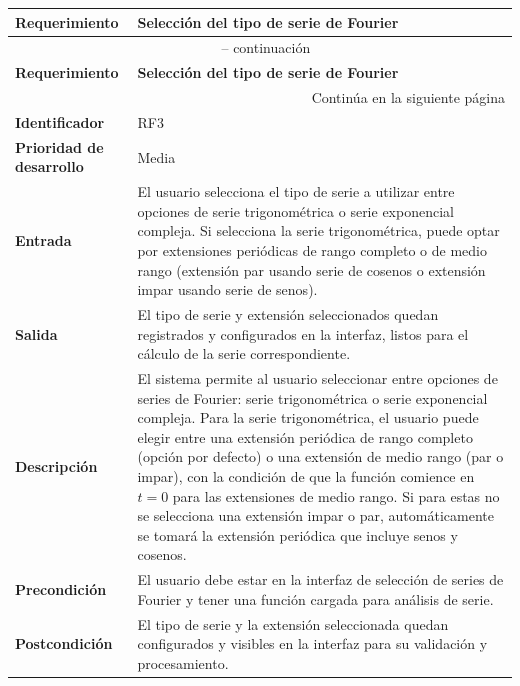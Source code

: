 \begin{longtable}{|m{3.5cm}|m{9.5cm}|}
	\hline
	\rowcolor{black!75} \color{white}\textbf{Requerimiento} & \color{white}\textbf{Selección del tipo de serie de Fourier} \\
	\hline
	\endfirsthead
	\multicolumn{2}{c}{{\tablename\ \thetable{} -- continuación}} \\
	\hline
	\rowcolor{black!75} \color{white}\textbf{Requerimiento} & \color{white}\textbf{Selección del tipo de serie de Fourier} \\
	\hline
	\endhead
	\hline \multicolumn{2}{r}{{Continúa en la siguiente página}} \\
	\endfoot
	\hline
	\endlastfoot
	
	\textbf{Identificador} & RF3 \\
	\hline
	\textbf{Prioridad de desarrollo} & Media \\
	\hline
	\textbf{Entrada} & El usuario selecciona el tipo de serie a utilizar entre opciones de serie trigonométrica o serie exponencial compleja. Si selecciona la serie trigonométrica, puede optar por extensiones periódicas de rango completo o de medio rango (extensión par usando serie de cosenos o extensión impar usando serie de senos). \\
	\hline
	\textbf{Salida} & El tipo de serie y extensión seleccionados quedan registrados y configurados en la interfaz, listos para el cálculo de la serie correspondiente. \\
	\hline
	\textbf{Descripción} & El sistema permite al usuario seleccionar entre opciones de series de Fourier: serie trigonométrica o serie exponencial compleja. Para la serie trigonométrica, el usuario puede elegir entre una extensión periódica de rango completo (opción por defecto) o una extensión de medio rango (par o impar), con la condición de que la función comience en \( t = 0 \) para las extensiones de medio rango. Si para estas no se selecciona una extensión impar o par, automáticamente se tomará la extensión periódica que incluye senos y cosenos. \\
	\hline
	\textbf{Precondición} & El usuario debe estar en la interfaz de selección de series de Fourier y tener una función cargada para análisis de serie. \\
	\hline
	\textbf{Postcondición} & El tipo de serie y la extensión seleccionada quedan configurados y visibles en la interfaz para su validación y procesamiento. \\
	\hline
\end{longtable}
\caption{Requerimiento funcional No. 3} \label{tabla:RF3}
\vspace{0.5cm}

